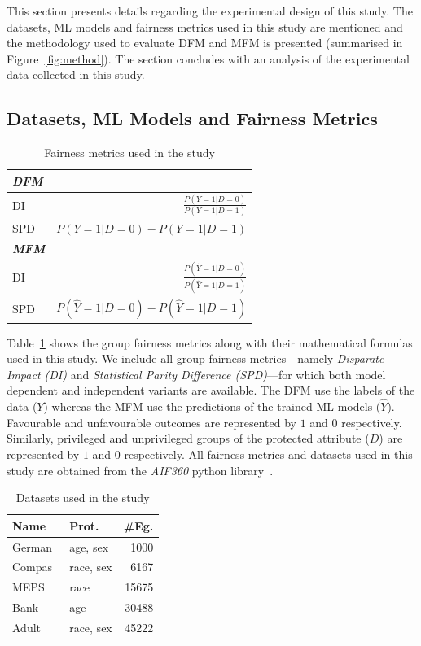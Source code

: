 \documentclass[conference]{IEEEtran}
\begin{document}
This section presents details regarding the experimental design of
this study. The datasets, ML models and fairness metrics used in this
study are mentioned and the methodology used to evaluate DFM and MFM
is presented (summarised in Figure \ref{fig:method}). The section
concludes with an analysis of the experimental data collected in this
study.

\subsection{Datasets, ML Models and Fairness Metrics}\label{sec:method-parameters}

\begin{table}
  \centering
  \caption{Fairness metrics used in the study}
  \begin{tabular}{l r}
    \hline
    \textbf{\emph{DFM}}\\
    \hline
    DI & \(\displaystyle \frac{P(Y=1|D=0)}{P(Y=1|D=1)}\)\\
    SPD & \(\displaystyle P(Y=1|D=0)-P(Y=1|D=1)\)\\
    \hline
    \textbf{\emph{MFM}}\\
    \hline
    DI & \(\displaystyle \frac{P(\hat{Y}=1|D=0)}{P(\hat{Y}=1|D=1)}\)\\
    SPD & \(\displaystyle P(\hat{Y}=1|D=0)-P(\hat{Y}=1|D=1)\)\\
    \hline
  \end{tabular}
  \label{tab:fairness-metrics}
\end{table}

Table \ref{tab:fairness-metrics} shows the group fairness metrics
along with their mathematical formulas used in this study. We include
all group fairness metrics---namely \emph{Disparate Impact (DI)} and
\emph{Statistical Parity Difference (SPD)}---for which both model
dependent and independent variants are available. The DFM use the
labels of the data ($Y$) whereas the MFM use the predictions of the
trained ML models ($\hat{Y}$). Favourable and unfavourable outcomes
are represented by $1$ and $0$ respectively. Similarly, privileged and
unprivileged groups of the protected attribute ($D$) are represented
by $1$ and $0$ respectively. All fairness metrics and datasets used in
this study are obtained from the \emph{AIF360} python
library \cite{bellamy2019ai}.

\begin{table}
  \centering
  \caption{Datasets used in the study}
  \begin{tabular}{l l r}
    \hline
    \textbf{Name} & \textbf{Prot.} & \textbf{\#Eg.}\\
    \hline
    German \cite{hofmann1994german} & age, sex & 1000\\
    Compas\cite{angwin2016machine} & race, sex & 6167\\
    MEPS \cite{mepsdata} & race & 15675\\
    Bank\cite{moro2014data} & age & 30488\\
    Adult\cite{kohavi1996scaling} & race, sex & 45222\\
    \hline
  \end{tabular}
  \label{tab:datasets}
\end{table}
\end{document}
